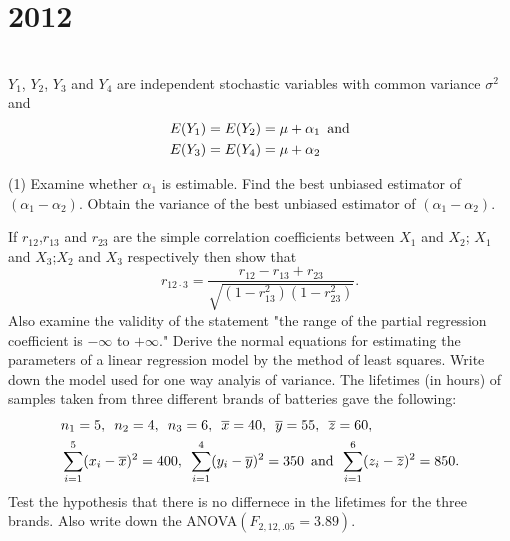 \section*{2012}
\vspace{-.5cm}
\hrulefill \smallskip\\
 $Y_1$, $Y_2$, $Y_3$ and $Y_4$ are independent stochastic variables with common variance $\sigma^2$ and \[ \begin{aligned}
    E(Y_1) &= E(Y_2) = \mu + \alpha_1 \enskip \text{and}\\
    E(Y_3) &= E(Y_4) = \mu + \alpha_2
\end{aligned}
\]\begin{tasks}(1)
\task Examine whether $\alpha_1$ is estimable.
\task Find the best unbiased estimator of $(\alpha_1 -\alpha_2)$.
\task Obtain the variance of the best unbiased estimator of $(\alpha_1 -\alpha_2)$.
\end{tasks}
 If $r_{12}$,$r_{13}$ and $r_{23}$ are the simple correlation coefficients between $X_1$ and $X_2$; $X_1$ and $X_3$;$X_2$ and $X_3$ respectively then show that \[ r_{12\cdot3} = \dfrac{r_{12}-r_{13}+r_{23}}{\sqrt{\left( 1 - r_{13}^2 \right)\left( 1 - r_{23}^2 \right)}}.\] Also examine the validity of the statement "the range of the partial regression coefficient is $-\infty$ to $+\infty$."
\myline
{} Derive the normal equations for estimating the parameters of a linear regression model by the method of least squares.
\myline
{} Write down the model used for one way analyis of variance. The lifetimes (in hours) of samples taken from three different brands of batteries gave the following:
\[\begin{aligned}
&n_1 =5, \enskip n_2 =4, \enskip n_3 = 6, \enskip \overline{x} = 40, \enskip\overline{y} = 55, \enskip\overline{z} = 60, \\
&\sum_{i=1}^{5}(x_i - \overline{x})^2 = 400 ,\enskip\sum_{i=1}^{4}(y_i - \overline{y})^2 = 350 \enskip \text{and} \enskip\sum_{i=1}^{6}(z_i - \overline{z})^2 = 850. 
\end{aligned}\] Test the hypothesis that there is no differnece in the lifetimes for the three brands. Also write down the ANOVA$(F_{2,12,.05} = 3.89)$.
